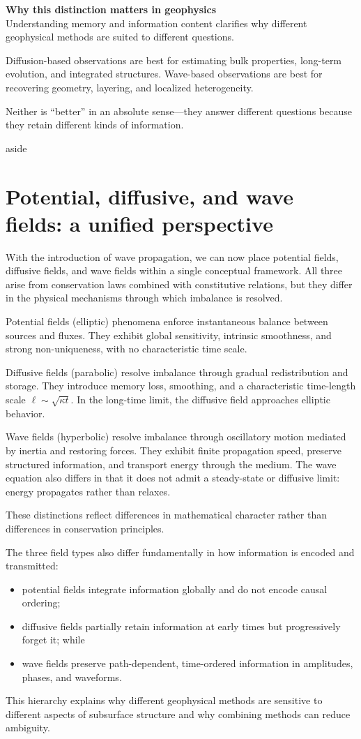 {    \medskip
    \noindent\textbf{Why this distinction matters in geophysics}\\
    Understanding memory and information content clarifies why different geophysical methods are suited to different questions.

    Diffusion-based observations are best for estimating bulk properties, long-term evolution, and integrated structures.  Wave-based observations are best for recovering geometry, layering, and localized heterogeneity.

    Neither is “better” in an absolute sense—they answer different questions because they retain different kinds of information.
}{aside}\label{box:information}


\section{Potential, diffusive, and wave fields: a unified perspective}
With the introduction of wave propagation, we can now place potential fields, diffusive fields, and wave fields within a single conceptual framework. All three arise from conservation laws combined with constitutive relations, but they differ in the physical mechanisms through which imbalance is resolved.

Potential fields (elliptic) phenomena enforce instantaneous balance between sources and fluxes. They exhibit global sensitivity, intrinsic smoothness, and strong non-uniqueness, with no characteristic time scale.

Diffusive fields (parabolic) resolve imbalance through gradual redistribution and storage. They introduce memory loss, smoothing, and a characteristic time-length scale $\ell \sim \sqrt{\kappa t}$. In the long-time limit, the diffusive field approaches elliptic behavior.

Wave fields (hyperbolic) resolve imbalance through oscillatory motion mediated by inertia and restoring forces. They exhibit finite propagation speed, preserve structured information, and transport energy through the medium.  The wave equation also differs in that it does not admit a steady-state or diffusive limit: energy propagates rather than relaxes.

These distinctions reflect differences in mathematical character rather than differences in conservation principles.

The three field types also differ fundamentally in how information is encoded and transmitted:
\begin{itemize}
    \item potential fields integrate information globally and do not encode causal ordering;
    \item diffusive fields partially retain information at early times but progressively forget it; while
    \item wave fields preserve path-dependent, time-ordered information in amplitudes, phases, and waveforms.
\end{itemize}
This hierarchy explains why different geophysical methods are sensitive to different aspects of subsurface structure and why combining methods can reduce ambiguity.

